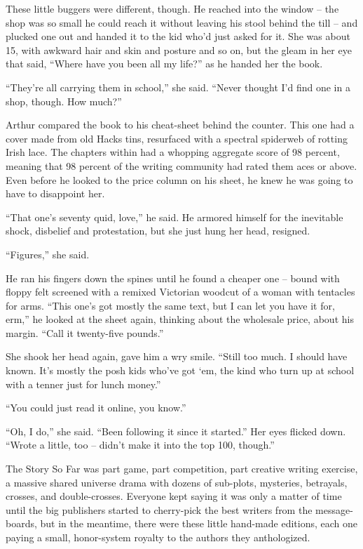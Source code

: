 These little buggers were different, though. He reached into the window 
-- the shop was so small he could reach it without leaving his stool 
behind the till -- and plucked one out and handed it to the kid who'd 
just asked for it. She was about 15, with awkward hair and skin and 
posture and so on, but the gleam in her eye that said, “Where have 
you been all my life?” as he handed her the book.

“They're all carrying them in school,” she said. “Never thought 
I'd find one in a shop, though. How much?”

Arthur compared the book to his cheat-sheet behind the counter. This 
one had a cover made from old Hacks tins, resurfaced with a spectral 
spiderweb of rotting Irish lace. The chapters within had a whopping 
aggregate score of 98 percent, meaning that 98 percent of the writing 
community had rated them aces or above. Even before he looked to the 
price column on his sheet, he knew he was going to have to disappoint 
her.

“That one's seventy quid, love,” he said. He armored himself for 
the inevitable shock, disbelief and protestation, but she just hung her 
head, resigned.

“Figures,” she said.

He ran his fingers down the spines until he found a cheaper one -- 
bound with floppy felt screened with a remixed Victorian woodcut of a 
woman with tentacles for arms. “This one's got mostly the same text, 
but I can let you have it for, erm,” he looked at the sheet again, 
thinking about the wholesale price, about his margin. “Call it 
twenty-five pounds.”

She shook her head again, gave him a wry smile. “Still too much. I 
should have known. It's mostly the posh kids who've got `em, the kind 
who turn up at school with a tenner just for lunch money.”

“You could just read it online, you know.”

“Oh, I do,” she said. “Been following it since it started.” Her 
eyes flicked down. “Wrote a little, too -- didn't make it into the 
top 100, though.”

The Story So Far was part game, part competition, part creative writing 
exercise, a massive shared universe drama with dozens of sub-plots, 
mysteries, betrayals, crosses, and double-crosses. Everyone kept saying 
it was only a matter of time until the big publishers started to 
cherry-pick the best writers from the message-boards, but in the 
meantime, there were these little hand-made editions, each one paying a 
small, honor-system royalty to the authors they anthologized.

